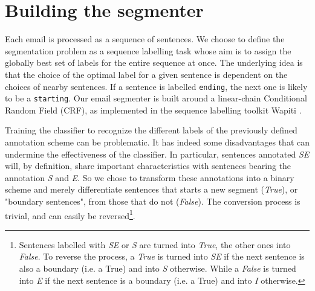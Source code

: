
\section{Building the segmenter}
\label{sec:buildingTheSegmenter}
Each email is processed as a sequence of sentences.
We choose to define the segmentation problem as a sequence labelling task whose aim is to assign the globally best set of labels for the entire sequence at once. The underlying idea is that the choice of the optimal label for a given sentence is dependent on the choices of nearby sentences.
If a sentence is labelled \texttt{\footnotesize ending}, the next one is likely to be a \texttt{\footnotesize starting}.
%
%
Our email segmenter is built around a linear-chain Conditional Random Field (CRF), as implemented in the sequence labelling toolkit Wapiti \cite{lavergne2010practical}.

Training the classifier to recognize the different labels of the previously defined annotation scheme can be problematic. It has indeed some disadvantages that can undermine the effectiveness of the classifier. In particular, sentences annotated \textit{SE} will, by definition, share important characteristics with sentences bearing the annotation \textit{S} and \textit{E}. 
So we chose to transform these annotations into a binary scheme and merely differentiate sentences that starts a new segment (\textit{True}), or "boundary sentences", from those that do not (\textit{False}). The conversion process is trivial, and can easily be reversed\footnote{Sentences labelled with \textit{SE} or \textit{S} are turned into \textit{True}, the other ones into \textit{False}. To reverse the process, a \textit{True} is turned into \textit{SE} if the next sentence is also a boundary (i.e. a True) and into \textit{S} otherwise. While a \textit{False} is turned into \textit{E} if the next sentence is a boundary (i.e. a True) and into  \textit{I} otherwise.}.

